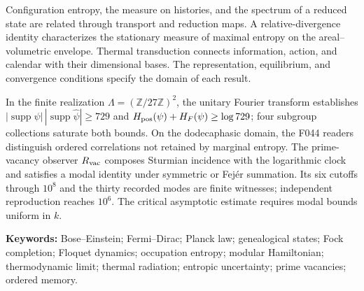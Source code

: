 Configuration entropy, the measure on histories, and the spectrum of a
reduced state are related through transport and reduction maps. A
relative-divergence identity characterizes the stationary measure of
maximal entropy on the areal--volumetric envelope. Thermal transduction
connects information, action, and calendar with their dimensional bases.
The representation, equilibrium, and convergence conditions specify the
domain of each result.

In the finite realization \(\Lambda=(\mathbb Z/27\mathbb Z)^2\), the
unitary Fourier transform establishes
\(|\operatorname{supp}\psi|\,|\operatorname{supp}\widehat\psi|\ge729\)
and \(H_{\rm pos}(\psi)+H_F(\psi)\ge\log729\); four subgroup collections
saturate both bounds. On the dodecaphasic domain, the F044 readers
distinguish ordered correlations not retained by marginal entropy. The
prime-vacancy observer \(R_{\rm vac}\) composes Sturmian incidence with
the logarithmic clock and satisfies a modal identity under symmetric or
Fejér summation. Its six cutoffs through \(10^8\) and the thirty recorded
modes are finite witnesses; independent reproduction reaches \(10^6\).
The critical asymptotic estimate requires modal bounds uniform in \(k\).

\medskip
\noindent\textbf{Keywords:} Bose--Einstein; Fermi--Dirac; Planck law;
genealogical states; Fock completion; Floquet dynamics; occupation entropy;
modular Hamiltonian; thermodynamic limit; thermal radiation; entropic
uncertainty; prime vacancies; ordered memory.
\par\endgroup
